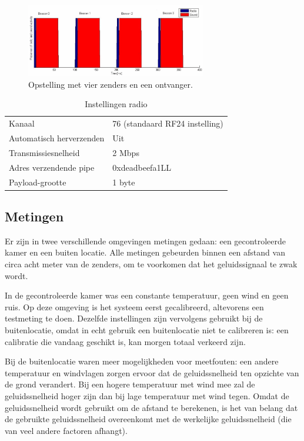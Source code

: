 \documentclass[a4paper,10pt]{article}
\begin{document}
\begin{figure}[ht!]
    \centering
    \includegraphics[width=0.7\textwidth]{tijdsdiagram_handleiding.png}
    \caption{Opstelling met vier zenders en een ontvanger.}
    \label{fig:tijdsdiagram_handleiding}
\end{figure}

\begin{table}[h]
    \begin{minipage}{\textwidth}
        \begin{tabular}{ l l }
            Kanaal                    & 76 (standaard RF24 instelling) \\
            Automatisch herverzenden  & Uit               \\
            Transmissiesnelheid       & 2 Mbps            \\
            Adres verzendende pipe    & 0xdeadbeefa1LL    \\
            Payload-grootte           & 1 byte
        \end{tabular}
        \caption{Instellingen radio}
        \label{table:instellingen}        
    \end{minipage}
\end{table}

\subsection{Metingen}
Er zijn in twee verschillende omgevingen metingen gedaan: een gecontroleerde kamer en een buiten locatie. Alle metingen gebeurden binnen een afstand van circa acht meter van de zenders, om te voorkomen dat het geluidssignaal te zwak wordt.

In de gecontroleerde kamer was een constante temperatuur, geen wind en geen ruis. Op deze omgeving is het systeem eerst gecalibreerd, altevorens een testmeting te doen. Dezelfde instellingen zijn vervolgens gebruikt bij de buitenlocatie, omdat in echt gebruik een buitenlocatie niet te calibreren is: een calibratie die vandaag geschikt is, kan morgen totaal verkeerd zijn.

Bij de buitenlocatie waren meer mogelijkheden voor meetfouten: een andere temperatuur en windvlagen zorgen ervoor dat de geluidssnelheid ten opzichte van de grond verandert. Bij een hogere temperatuur met wind mee zal de geluidssnelheid hoger zijn dan bij lage temperatuur met wind tegen. Omdat de geluidssnelheid wordt gebruikt om de afstand te berekenen, is het van belang dat de gebruikte geluidssnelheid overeenkomt met de werkelijke geluidssnelheid (die van veel andere factoren afhangt).
\end{document}
